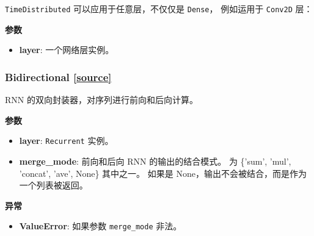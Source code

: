 \texttt{TimeDistributed} 可以应用于任意层，不仅仅是 \texttt{Dense}，
例如运用于 \texttt{Conv2D} 层：

\begin{Shaded}
\begin{Highlighting}[]
\OperatorTok{=} 
\NormalTok{, (}\NormalTok{, }\NormalTok{)),}
                          \OperatorTok{=}\NormalTok{(}\NormalTok{, }\NormalTok{, }\NormalTok{, }\NormalTok{)))}
\end{Highlighting}
\end{Shaded}

\textbf{参数}

\begin{itemize}
\tightlist
\item
  \textbf{layer}: 一个网络层实例。
\end{itemize}



\subsubsection{Bidirectional {\href{https://github.com/keras-team/keras/blob/master/keras/layers/wrappers.py\#L221}{{[}source{]}}}}

\begin{Shaded}
\begin{Highlighting}[]
\OperatorTok{=}\OperatorTok{=}\NormalTok{)}
\end{Highlighting}
\end{Shaded}

RNN 的双向封装器，对序列进行前向和后向计算。

\textbf{参数}

\begin{itemize}
\tightlist
\item
  \textbf{layer}: \texttt{Recurrent} 实例。
\item
  \textbf{merge\_mode}: 前向和后向 RNN 的输出的结合模式。 为 \{'sum',
  'mul', 'concat', 'ave', None\} 其中之一。 如果是
  None，输出不会被结合，而是作为一个列表被返回。
\end{itemize}

\textbf{异常}

\begin{itemize}
\tightlist
\item
  \textbf{ValueError}: 如果参数 \texttt{merge\_mode} 非法。
\end{itemize}

